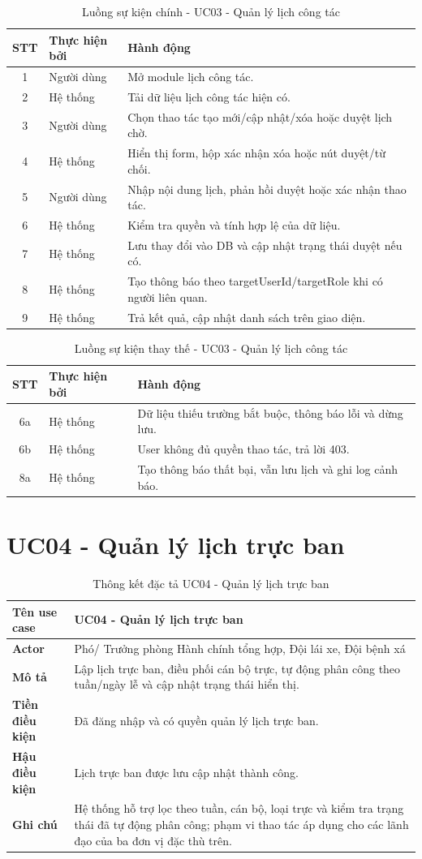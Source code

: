 \documentclass[18pt,a4paper]{report}
\newcommand{\specinfo}[6]{
\begin{table}[H]
\centering
\caption{Thông kết đặc tả #1}
\begin{tabularx}{\textwidth}{|>{\raggedright\arraybackslash}p{3.2cm}|X|}
\hline
\textbf{Tên use case} & #1 \\ \hline
\textbf{Actor} & #2 \\ \hline
\textbf{Mô tả} & #3 \\ \hline
\textbf{Tiền điều kiện} & #4 \\ \hline
\textbf{Hậu điều kiện} & #5 \\ \hline
\textbf{Ghi chú} & #6 \\ \hline
\end{tabularx}
\end{table}
}
\newcommand{\mainflowtable}[1]{
\begin{table}[H]
\centering
\caption{Luồng sự kiện chính - #1}
\begin{tabularx}{\textwidth}{|c|>{\raggedright\arraybackslash}p{3cm}|X|}
\hline
\textbf{STT} & \textbf{Thực hiện bởi} & \textbf{Hành động} \\ \hline
}
\newcommand{\altflowtable}[1]{
\begin{table}[H]
\centering
\caption{Luồng sự kiện thay thế - #1}
\begin{tabularx}{\textwidth}{|c|>{\raggedright\arraybackslash}p{3cm}|X|}
\hline
\textbf{STT} & \textbf{Thực hiện bởi} & \textbf{Hành động} \\ \hline
}
\begin{document}
\mainflowtable{UC03 - Quản lý lịch công tác}
1 & Người dùng & Mở module lịch công tác. \\ \hline
2 & Hệ thống & Tải dữ liệu lịch công tác hiện có. \\ \hline
3 & Người dùng & Chọn thao tác tạo mới/cập nhật/xóa hoặc duyệt lịch chờ. \\ \hline
4 & Hệ thống & Hiển thị form, hộp xác nhận xóa hoặc nút duyệt/từ chối. \\ \hline
5 & Người dùng & Nhập nội dung lịch, phản hồi duyệt hoặc xác nhận thao tác. \\ \hline
6 & Hệ thống & Kiểm tra quyền và tính hợp lệ của dữ liệu. \\ \hline
7 & Hệ thống & Lưu thay đổi vào DB và cập nhật trạng thái duyệt nếu có. \\ \hline
8 & Hệ thống & Tạo thông báo theo targetUserId/targetRole khi có người liên quan. \\ \hline
9 & Hệ thống & Trả kết quả, cập nhật danh sách trên giao diện. \\ \hline
\end{tabularx}
\end{table}

\altflowtable{UC03 - Quản lý lịch công tác}
6a & Hệ thống & Dữ liệu thiếu trường bắt buộc, thông báo lỗi và dừng lưu. \\ \hline
6b & Hệ thống & User không đủ quyền thao tác, trả lời 403. \\ \hline
8a & Hệ thống & Tạo thông báo thất bại, vẫn lưu lịch và ghi log cảnh báo. \\ \hline
\end{tabularx}
\end{table}

\section{UC04 - Quản lý lịch trực ban}
\specinfo
{UC04 - Quản lý lịch trực ban}
{Phó/ Trưởng phòng Hành chính tổng hợp, Đội lái xe, Đội bệnh xá}
{Lập lịch trực ban, điều phối cán bộ trực, tự động phân công theo tuần/ngày lễ và cập nhật trạng thái hiển thị.}
{Đã đăng nhập và có quyền quản lý lịch trực ban.}
{Lịch trực ban được lưu cập nhật thành công.}
{Hệ thống hỗ trợ lọc theo tuần, cán bộ, loại trực và kiểm tra trạng thái đã tự động phân công; phạm vi thao tác áp dụng cho các lãnh đạo của ba đơn vị đặc thù trên.}
\end{document}

